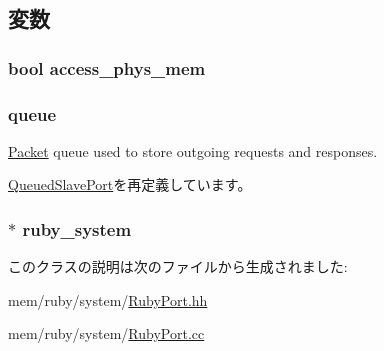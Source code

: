 \subsection{変数}
\hypertarget{classRubyPort_1_1MemSlavePort_a5925f629d4ec58811bba7c4fa6b4d64d}{
\subsubsection[{access\_\-phys\_\-mem}]{\setlength{\rightskip}{0pt plus 5cm}bool {\bf access\_\-phys\_\-mem}}}
\label{classRubyPort_1_1MemSlavePort_a5925f629d4ec58811bba7c4fa6b4d64d}
\hypertarget{classRubyPort_1_1MemSlavePort_a3055168363a9ed42f38173363b6c1975}{
\subsubsection[{queue}]{ {\bf queue}}}
\label{classRubyPort_1_1MemSlavePort_a3055168363a9ed42f38173363b6c1975}
\hyperlink{classPacket}{Packet} queue used to store outgoing requests and responses. 

\hyperlink{classQueuedSlavePort_a89fcdbe2ab63d24f2112bc7e05bf2413}{QueuedSlavePort}を再定義しています。\hypertarget{classRubyPort_1_1MemSlavePort_a88928242e9a532cb6f4abe42dd8240a7}{
\subsubsection[{ruby\_\-system}]{$\ast$ {\bf ruby\_\-system}}}
\label{classRubyPort_1_1MemSlavePort_a88928242e9a532cb6f4abe42dd8240a7}


このクラスの説明は次のファイルから生成されました:\begin{DoxyCompactItemize}
\item 
mem/ruby/system/\hyperlink{RubyPort_8hh}{RubyPort.hh}\item 
mem/ruby/system/\hyperlink{RubyPort_8cc}{RubyPort.cc}\end{DoxyCompactItemize}
